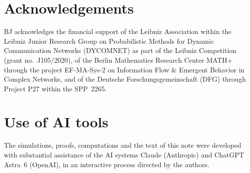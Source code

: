\documentclass[11pt,letterpaper]{article}
\begin{document}
\section*{Acknowledgements}

BJ acknowledges the financial support of the Leibniz Association within the Leibniz Junior Research Group on Probabilistic Methods for Dynamic Communication Networks (DYCOMNET) as part of the Leibniz Competition (grant no.~J105/2020), of the Berlin Mathematics Research Center MATH+ through the project EF-MA-Sys-2 on Information Flow \& Emergent Behavior in Complex Networks, and of the Deutsche Forschungsgemeinschaft (DFG) through Project P27 within the SPP~2265.

\section*{Use of AI tools}

The simulations, proofs, computations and the text of this note were developed with substantial assistance of the AI systems Claude (Anthropic) and ChatGPT Astra~6 (OpenAI), in an interactive process directed by the authors.



\end{document}
